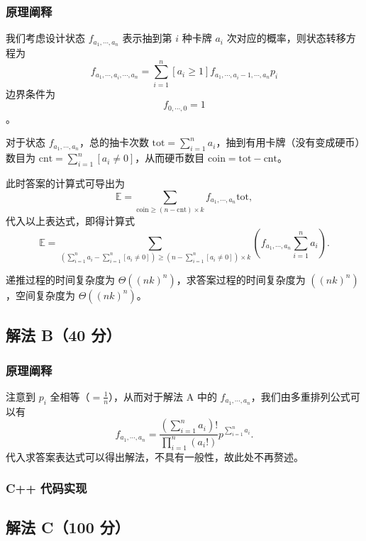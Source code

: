 		\subsubsection{原理阐释}
			\par 我们考虑设计状态 $f_{a_1,\cdots,a_n}$ 表示抽到第 $i$ 种卡牌 $a_i$ 次对应的概率，则状态转移方程为
			$$f_{a_1,\cdots,a_i,\cdots,a_n}=\sum\limits_{i=1}^n[a_i\geq 1]f_{a_1,\cdots,a_i-1,\cdots,a_n}p_i$$
			边界条件为
			$$f_{0,\cdots,0}=1$$。
			\par 对于状态 $f_{a_1,\cdots,a_n}$，总的抽卡次数 $\text{tot}=\sum\limits_{i=1}^na_i$，抽到有用卡牌（没有变成硬币）数目为 $\text{cnt}=\sum\limits_{i=1}^n[a_i\neq 0]$，从而硬币数目 $\text{coin}=\text{tot}-\text{cnt}$。
			\par 此时答案的计算式可导出为
			$$\mathbb{E}=\sum\limits_{\text{coin}\geq (n-\text{cnt})\times k}f_{a_1,\cdots,a_n}\text{tot},$$
			代入以上表达式，即得计算式
			$$\mathbb{E}=\sum\limits_{\left(\sum\limits_{i=1}^na_i-\sum\limits_{i=1}^n[a_i\neq 0]\right)\geq \left(n-\sum\limits_{i=1}^n[a_i\neq 0]\right)\times k}\left(f_{a_1,\cdots,a_n}\sum\limits_{i=1}^na_i\right).$$
			\par 递推过程的时间复杂度为 $\Theta((nk)^n)$，求答案过程的时间复杂度为 $((nk)^n)$，空间复杂度为 $\Theta((nk)^n)$。
	\subsection{解法 B（40 分）}
		\subsubsection{原理阐释}
			注意到 $p_i$ 全相等（$=\frac{1}{n}$），从而对于解法 A 中的 $f_{a_1,\cdots,a_n}$，我们由多重排列公式可以有
			$$f_{a_1,\cdots,a_n}=\frac{\left(\sum\limits_{i=1}^na_i\right)!}{\prod\limits_{i=1}^n(a_i!)}p^{\sum\limits_{i=1}^na_i}.$$
			代入求答案表达式可以得出解法，不具有一般性，故此处不再赘述。
		\subsubsection{C++ 代码实现}
	\subsection{解法 C（100 分）}
